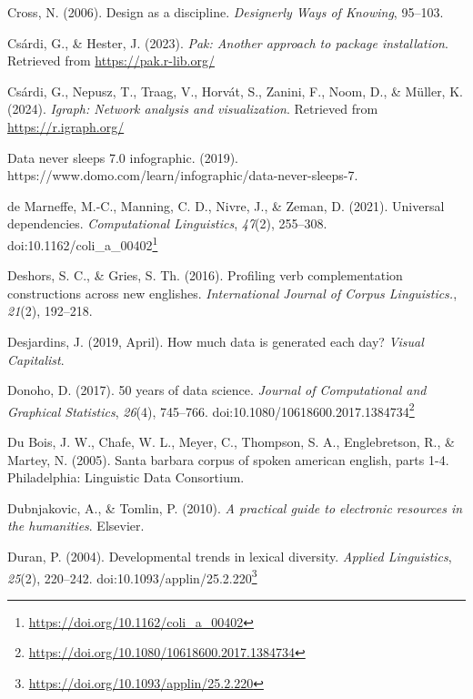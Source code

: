 \documentclass[
  letterpaper,
]{latex/krantz}
\newlength{\cslhangindent}
\newenvironment{CSLReferences}[2] %
 {\begin{list}{}{%
  \setlength{\itemindent}{0pt}
  \setlength{\leftmargin}{0pt}
  \setlength{\parsep}{0pt}
  \ifodd #1
   \setlength{\leftmargin}{\cslhangindent}
   \setlength{\itemindent}{-1\cslhangindent}
  \fi
  \setlength{\itemsep}{#2\baselineskip}}}
 {\end{list}}
\theoremstyle{definition}
\theoremstyle{remark}
\DeclareRobustCommand{\href}[2]{#2\footnote{\url{#1}}}
\begin{document}
\begin{CSLReferences}{1}{0}
Cross, N. (2006). Design as a discipline. \emph{Designerly Ways of
Knowing}, 95--103.

Csárdi, G., \& Hester, J. (2023). \emph{Pak: Another approach to package
installation}. Retrieved from \url{https://pak.r-lib.org/}

Csárdi, G., Nepusz, T., Traag, V., Horvát, S., Zanini, F., Noom, D., \&
Müller, K. (2024). \emph{Igraph: Network analysis and visualization}.
Retrieved from \url{https://r.igraph.org/}

Data never sleeps 7.0 infographic. (2019).
https://www.domo.com/learn/infographic/data-never-sleeps-7.

de Marneffe, M.-C., Manning, C. D., Nivre, J., \& Zeman, D. (2021).
Universal dependencies. \emph{Computational Linguistics}, \emph{47}(2),
255--308.
doi:\href{https://doi.org/10.1162/coli_a_00402}{10.1162/coli\_a\_00402}

Deshors, S. C., \& Gries, S. Th. (2016). Profiling verb complementation
constructions across new englishes. \emph{International Journal of
Corpus Linguistics.}, \emph{21}(2), 192--218.

Desjardins, J. (2019, April). How much data is generated each day?
\emph{Visual Capitalist}.

Donoho, D. (2017). 50 years of data science. \emph{Journal of
Computational and Graphical Statistics}, \emph{26}(4), 745--766.
doi:\href{https://doi.org/10.1080/10618600.2017.1384734}{10.1080/10618600.2017.1384734}

Du Bois, J. W., Chafe, W. L., Meyer, C., Thompson, S. A., Englebretson,
R., \& Martey, N. (2005). Santa barbara corpus of spoken american
english, parts 1-4. Philadelphia: Linguistic Data Consortium.

Dubnjakovic, A., \& Tomlin, P. (2010). \emph{A practical guide to
electronic resources in the humanities}. Elsevier.

Duran, P. (2004). Developmental trends in lexical diversity.
\emph{Applied Linguistics}, \emph{25}(2), 220--242.
doi:\href{https://doi.org/10.1093/applin/25.2.220}{10.1093/applin/25.2.220}


\end{CSLReferences}
\end{document}
